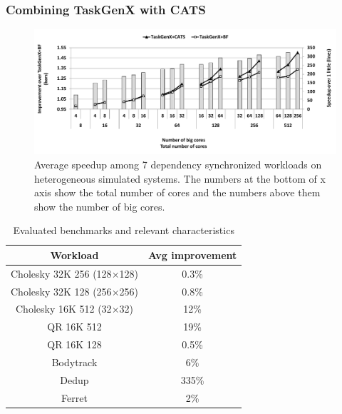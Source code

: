 \subsubsection{Combining TaskGenX with CATS}
\begin{figure}[t]%
	\centering
	\includegraphics[width=\columnwidth]{figures/TaskGenX+CATS.pdf}
	\caption{Average speedup among 7 dependency synchronized workloads on heterogeneous simulated systems. The numbers at the bottom of x axis show the total number of cores and the numbers above them show the number of big cores.}	
	\label{fig:taskgenx_cats}
\end{figure}
\begin{table}[t]
	\begin{center}
		\caption{Evaluated benchmarks and relevant characteristics}
		\label{tab.taskgenx_cats}
		\begin{tabular}{|c|c|}
			\hline
			Workload & Avg improvement \\%
			\hline
			{\parbox{60mm}{\centering Cholesky 32K 256 (128$\times$128)}} & 0.3\% \\%
			\hline
			{\parbox{60mm}{\centering Cholesky 32K 128 (256$\times$256)}} & 0.8\% \\%
			\hline
			{\parbox{60mm}{\centering Cholesky 16K 512 (32$\times$32)}} & 12\% \\%
			\hline
			QR 16K 512 & 19\% \\%
			\hline
			QR 16K 128 & 0.5\% \\%
			\hline
			Bodytrack & 6\% \\%
			\hline
			Dedup & 335\% \\%
			\hline 
			Ferret & 2\% \\%
			\hline 
		\end{tabular}%
	\end{center}
\end{table}			
